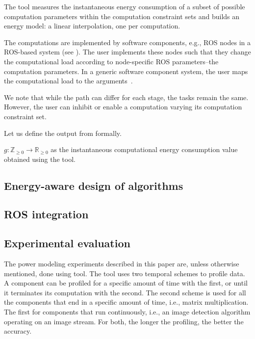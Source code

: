 The tool measures the instantaneous energy consumption of a subset of possible computation parameters within the computation constraint sets and builds an energy model: a linear interpolation, one per computation. 

The computations are implemented by software components, e.g., ROS nodes in a ROS-based system (see ). The user implements these nodes such that they change the computational load according to node-specific ROS parameters--the computation parameters. In a generic software component system, the user maps the computational load to the arguments~\citep{seewald2019component}.

We note that while the path can differ for each stage, the tasks remain the same. However, the user can inhibit or enable a computation varying its computation constraint set.

Let us define the output from \powprof{} formally.

\begin{highlight}
\begin{defn}\label{def:comp-ener}
  $g:\mathbb{Z}_{\geq 0}\rightarrow\mathbb{R}_{\geq 0}$ as the instantaneous computational energy consumption value obtained using the \powprof{} tool.  
\end{defn}
\end{highlight}

\subsection{\color{red}Energy-aware design of algorithms}

\subsection{\color{red}ROS integration}
\label{sec:rosmiddle}

\subsection{\color{cyan}Experimental evaluation}


The power modeling experiments described in this paper are, unless otherwise mentioned, done using \powprof{} tool. The tool uses two temporal schemes to profile data. A component can be profiled for a specific amount of time with the first, or until it terminates its computation with the second. The second scheme is used for all the components that end in a specific amount of time, i.e., matrix multiplication. The first for components that run continuously, i.e., an image detection algorithm operating on an image stream. For both, the longer the profiling, the better the accuracy. 

